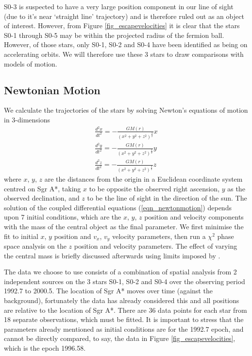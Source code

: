 S0-3 is suspected to have a very large position component in our line of sight (due to it's near `straight line' trajectory)
and is therefore ruled out as an object of interest.
However, from Figure \ref{fig_escapevelocities} it is clear that the stars S0-1 through S0-5 may be within the projected radius
of the fermion ball. However, of those stars, only S0-1, S0-2 and S0-4 have been identified as being on accelerating orbits.
We will therefore use these 3 stars to draw comparisons with models of motion.

\subsection{Newtonian Motion}
We calculate the trajectories of the stars by solving Newton's equations of motion in 3-dimensions
\begin{eqnarray}
	\frac{d^2x}{dt^2} = - \frac{G M(r)}{\left(x^2 + y^2 + z^2\right)^{\frac{3}{2}}}x \nonumber \\
	\frac{d^2y}{dt^2} = - \frac{G M(r)}{\left(x^2 + y^2 + z^2\right)^{\frac{3}{2}}}y
	\label{eqn_newtonmotion} \\
	\frac{d^2z}{dt^2} = - \frac{G M(r)}{\left(x^2 + y^2 + z^2\right)^{\frac{3}{2}}}z \nonumber
\end{eqnarray}
where $x$, $y$, $z$ are the distances from the origin in a Euclidean coordinate system centred on Sgr A*,
taking $x$ to be opposite the observed right ascension, $y$ as the observed declination, and $z$ to be the line of sight in the
direction of the sun.
The solution of the coupled differential equations (\ref{eqn_newtonmotion}) depends upon 7 initial conditions, which are the $x$, $y$, $z$
position and velocity components with the mass of the central object as the final parameter. We first minimise the fit to initial $x$, $y$
position and $v_x$, $v_y$ velocity parameters, then run a $\chi^2$ phase space analysis on the $z$ position and velocity parameters.
The effect of varying the central mass is briefly discussed afterwards using limits imposed by \cite{ref_ghezmotion}.

The data we choose to use consists of a combination of spatial analysis from 2 independent sources \cite{ref_ghezorbits, ref_eckartorbits}
on the 3 stars S0-1, S0-2 and S0-4 over the observing period 1992.7 to 2000.5. The location of Sgr A* moves over time (against the background),
fortunately the data has already considered this and all positions are relative to the location of Sgr A*. There are 36
data points for each star from 18 separate observations, which must be fitted. It is important to stress that the parameters already
mentioned as initial conditions are for the 1992.7 epoch, and cannot be directly compared, to say, the data in Figure
\ref{fig_escapevelocities}, which is the epoch 1996.58.

